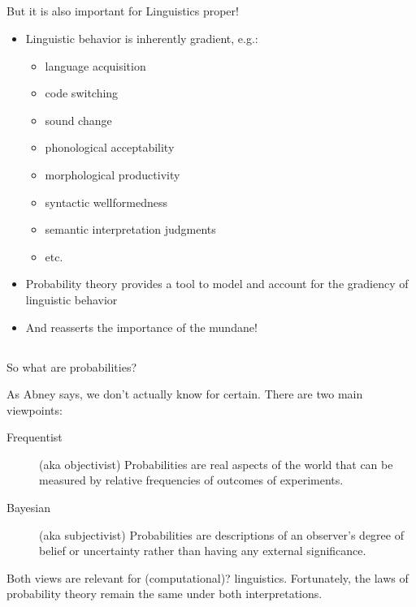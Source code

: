 \documentclass[9pt,xcolor=pdftex,dvipsnames,table]{beamer}
\begin{document}
\subsection{}
\begin{frame}{But it is also important for Linguistics proper!}
	\begin{itemize}
		\item Linguistic behavior is inherently gradient, e.g.:
		\begin{itemize}
		     \item language acquisition
		     \item code switching
		     \item sound change
		     \item phonological acceptability
		     \item morphological productivity
		     \item syntactic wellformedness
		     \item semantic interpretation judgments
		     \item etc.
		\end{itemize}
		\item Probability theory provides a tool to model and account for the gradiency of linguistic behavior\textbf{}
		\item And reasserts the importance of the mundane!
	\end{itemize}
\end{frame}

\subsection{}
\begin{frame}{So what are probabilities?}
\vspace{.5cm}

{\large As Abney says, we don't actually know for certain.  There are two main viewpoints: }
\vspace{.5cm}
     \begin{description}
          \item[Frequentist] (aka objectivist)  Probabilities are real aspects of the world that can be measured by relative frequencies of outcomes of experiments.

          \item[Bayesian] (aka subjectivist) Probabilities are descriptions of an observer's degree of belief or uncertainty rather than having any external significance.

     \end{description}

Both views are relevant for (computational)? linguistics.  Fortunately, the laws of probability theory remain the same under both interpretations.

\end{frame}
\end{document}
